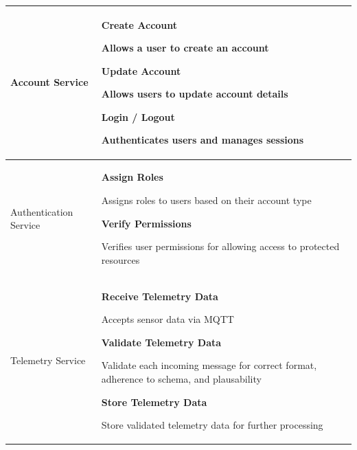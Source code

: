 {\begin{table}[H]
\begin{tabularx}{\textwidth}{|>{\raggedright\arraybackslash}p{4cm}|X|}
Account Service &
\begin{compactitem}
    \item \textbf{Create Account}
    \begin{compactitem}
        \item Allows a user to create an account
    \end{compactitem}
    \item \textbf{Update Account}
    \begin{compactitem}
        \item Allows users to update account details
    \end{compactitem}
    \item \textbf{Login / Logout}
    \begin{compactitem}
        \item Authenticates users and manages sessions
    \end{compactitem}
\end{compactitem}
\\
\hline

Authentication Service &
\begin{compactitem}
	\item \textbf{Assign Roles}
	\begin{compactitem}
		\item Assigns roles to users based on their account type
	\end{compactitem}
	\item \textbf{Verify Permissions}
	\begin{compactitem}
		\item Verifies user permissions for allowing access to protected resources
	\end{compactitem}
\end{compactitem}
\\
\hline

Telemetry Service &
\begin{compactitem}
    \item \textbf{Receive Telemetry Data}
    \begin{compactitem}
        \item Accepts sensor data via MQTT
    \end{compactitem}
	\item \textbf{Validate Telemetry Data}
    \begin{compactitem}
        \item Validate each incoming message for correct format, adherence to schema, and plausability
    \end{compactitem}
	\item \textbf{Store Telemetry Data}
    \begin{compactitem}
        \item Store validated telemetry data for further processing
    \end{compactitem}
\end{compactitem}
\\
\hline


\end{tabularx}
\end{table}}
